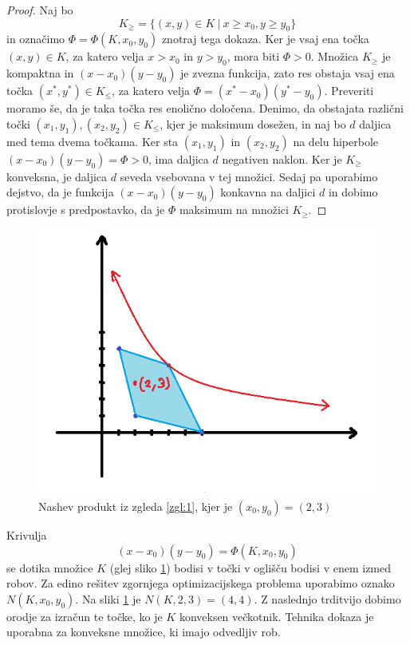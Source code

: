 \documentclass[10pt, a4paper]{article}
\newenvironment{noticeC}{%
  \tcolorbox[%
  notitle,
  empty,
  enhanced,  %
  breakable,
  coltext=black, 
  fontupper=\rmfamily,
  parbox=false,
  noparskip,
  sharp corners,
  boxrule=-1pt,  %
  frame hidden,
  left=7pt,  %
  right=7pt,
  top=5pt,
  bottom=5pt,
  before skip=2.5ex plus 2pt,
  after skip=2.5ex plus 2pt,
  overlay unbroken and last={%
  },
  ]}
{\endtcolorbox}
\newenvironment{dokaz}%
  {\begin{noticeC}\begin{proof}}%
  {\end{proof}\end{noticeC}}
\begin{document}
\begin{dokaz}
  Naj bo $$K_{\geq} = \{(x, y) \in K\ |\ x \geq x_0, y \geq y_0\}$$
  in označimo $\Phi = \Phi(K, x_0, y_0)$ znotraj tega dokaza.
  Ker je vsaj ena točka $(x, y) \in K$, za katero velja $x > x_0$ in $y > y_0$, mora biti $\Phi > 0$.
  Množica $K_{\geq}$ je kompaktna in $(x - x_0) (y - y_0)$ je zvezna funkcija, zato res obstaja vsaj ena točka 
  $(x^*, y^*) \in K_{\leq}$, za katero velja $\Phi = (x^* - x_0)(y^* - y_0)$.
  Preveriti moramo še, da je taka točka res enolično določena.
  Denimo, da obstajata različni točki $(x_1, y_1),(x_2, y_2) \in K_{\leq}$,
  kjer je maksimum dosežen, in naj bo $d$ daljica med tema dvema točkama.
  Ker sta $(x_1, y_1)$ in $(x_2, y_2)$ na delu hiperbole $(x - x_0)(y - y_0) = \Phi > 0$,
  ima daljica $d$ negativen naklon. Ker je $K_{\geq}$ konveksna, je daljica $d$ 
  seveda vsebovana v tej množici. Sedaj pa uporabimo dejstvo, da je funkcija 
  $(x - x_0) (y - y_0)$ konkavna na daljici $d$ in dobimo protislovje s predpostavko, da je $\Phi$
  maksimum na množici $K_{\geq}$.
\end{dokaz}

\begin{figure}
  \centering
  \includegraphics{images/slika5.png}
  \caption{Nashev produkt iz zgleda \ref{zgl:1}, kjer je $(x_0, y_0) = (2, 3)$}
  \label{fig:1}
\end{figure}

Krivulja $$(x - x_0)(y - y_0) = \Phi(K, x_0, y_0)$$
se dotika množice $K$ (glej sliko \ref{fig:1}) bodisi v točki v oglišču bodisi v enem izmed robov.
Za edino rešitev zgornjega optimizacijskega problema uporabimo oznako $N(K, x_0, y_0)$.
Na sliki \ref{fig:1} je $N(K, 2, 3) = (4, 4)$. Z naslednjo trditvijo dobimo orodje za izračun te točke,
ko je $K$ konveksen večkotnik. Tehnika dokaza je uporabna za konveksne množice, ki imajo odvedljiv rob.
\end{document}

